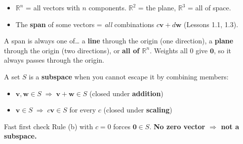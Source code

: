 \documentclass[aspectratio=169, 11pt]{beamer}
\newcommand{\vv}{\mathbf{v}}
\newcommand{\ww}{\mathbf{w}}
\newcommand{\zero}{\mathbf{0}}
\begin{document}
\begin{frame}[t, plain]
  \begin{itemize}
    \setlength{\itemsep}{6pt}
    \item $\mathbb{R}^n$ = all vectors with $n$ components. $\mathbb{R}^2$ = the plane, $\mathbb{R}^3$ = all of space.
    \item The \textbf{span} of some vectors = \emph{all} combinations $c\vv+d\ww$ (Lessons 1.1, 1.3).
  \end{itemize}
  \vspace{4pt}
  \begin{block}{A span is always one of\dots}
    a \textbf{line} through the origin (one direction), a \textbf{plane} through the origin (two
    directions), or \textbf{all of $\mathbb{R}^n$}. Weights all $0$ give $\zero$, so it always
    passes through the origin.
  \end{block}
\end{frame}

\begin{frame}[t, plain]
  A set $S$ is a \textbf{subspace} when you cannot escape it by combining members:
  \begin{itemize}
    \setlength{\itemsep}{5pt}
    \item[\textbf{(a)}] $\vv,\ww \in S \;\Rightarrow\; \vv+\ww \in S$ \quad(closed under \textbf{addition})
    \item[\textbf{(b)}] $\vv \in S \;\Rightarrow\; c\vv \in S$ for every $c$ \quad(closed under \textbf{scaling})
  \end{itemize}
  \vspace{4pt}
  \begin{block}{Fast first check}
    Rule (b) with $c=0$ forces $\zero \in S$. \textbf{No zero vector $\Rightarrow$ not a subspace.}
  \end{block}
\end{frame}
\end{document}
